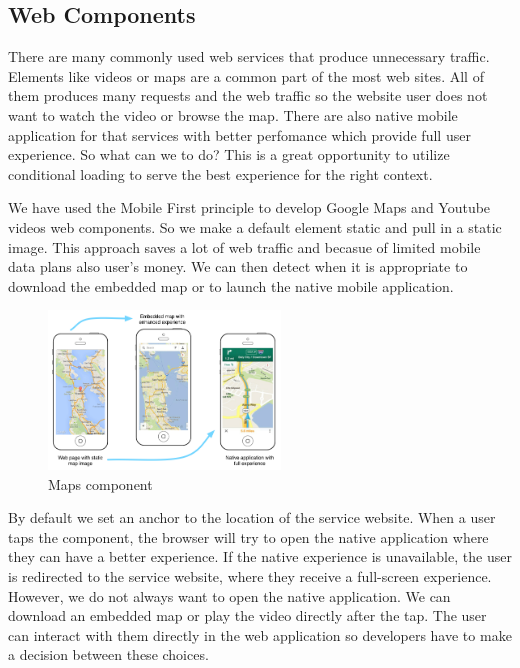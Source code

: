\documentclass{iitsrc}
\begin{document}



\subsection{Web Components} %
\label{sub:web_components}

There are many commonly used web services that produce unnecessary traffic. Elements like videos or maps are a common part of the most web sites. All of them produces many requests and the web traffic so the website user does not want to watch the video or browse the map. There are also native mobile application for that services with better perfomance which provide full user experience. So what can we to do? This is a great opportunity to utilize conditional loading to serve the best experience for the right context.

We have used the Mobile First principle to develop Google Maps and Youtube videos web components. So we make a default element static and pull in a static image. This approach saves a lot of web traffic and becasue of limited mobile data plans also user's money. We can then detect when it is appropriate to download the embedded map or to launch the native mobile application.

\begin{figure}[ht]
    \begin{center}
        \includegraphics[width=0.55\textwidth]{../images/maps.png}
        \caption{Maps component}
        \label{fig:maps}
    \end{center}
\end{figure}

\noindent By default we set an anchor to the location of the service website. When a user taps the component, the browser will try to open the native application where they can have a better experience. If the native experience is unavailable, the user is redirected to the service website, where they receive a full-screen experience. However, we do not always want to open the native application. We can download an embedded map or play the video directly after the tap. The user can interact with them directly in the web application so developers have to make a decision between these choices.
\end{document}
